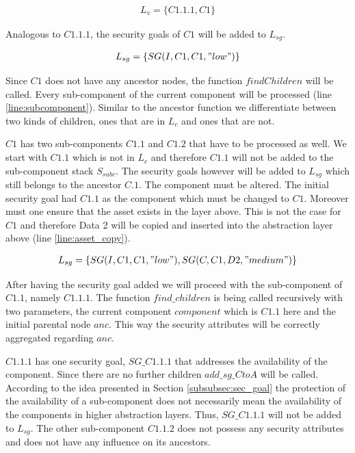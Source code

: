 \begin{align*}
L_v = \{C1.1.1, C1\}
\end{align*}

Analogous to $C1.1.1$, the security goals of $C1$ will be added to $L_{sg}$.

\begin{align*}
L_{sg} = \{SG(I,C1,C1,"low")\}
\end{align*}

Since $C1$ does not have any ancestor nodes, the function $findChildren$ will be called.  Every sub-component of the current component will be processed (line \ref{line:subcomponent}). Similar to the ancestor function we differentiate between two kinds of children, ones that are in $L_c$ and ones that are not.

$C1$ has two sub-components $C1.1$ and $C1.2$ that have to be processed as well. We start with $C1.1$ which is not in $L_c$ and therefore $C1.1$ will not be added to the sub-component stack $S_{subc}$. The security goals however will be added to $L_{sg}$ which still belongs to the ancestor $C.1$. The component must be altered. The initial security goal had $C1.1$ as the component which must be changed to $C1$. Moreover must one ensure that the asset exists in the layer above. This is not the case for $C1$ and therefore Data 2 will be copied and inserted into the abstraction layer above (line \ref{line:asset_copy}).

\begin{align*}
L_{sg} = \{SG(I,C1,C1,"low"), SG(C,C1,D2, "medium")\}
\end{align*}

After having the security goal added we will proceed with the sub-component of $C1.1$, namely $C1.1.1$. The function $find\_children$ is being called recursively with two parameters, the current component $component$ which is $C1.1$ here and the initial parental node $anc$. This way the security attributes will be correctly aggregated regarding $anc$.

$C1.1.1$ has one security goal, $SG\_C1.1.1$ that addresses the availability of the component. Since there are no further children $add\_sg\_CtoA$ will be called. According to the idea presented in Section \ref{subsubsec:sec_goal} the protection of the availability of a sub-component does not necessarily mean the availability of the components in higher abstraction layers. Thus, $SG\_C1.1.1$ will not be added to $L_{sg}$. The other sub-component $C1.1.2$ does not possess any security attributes and does not have any influence on its ancestors.

